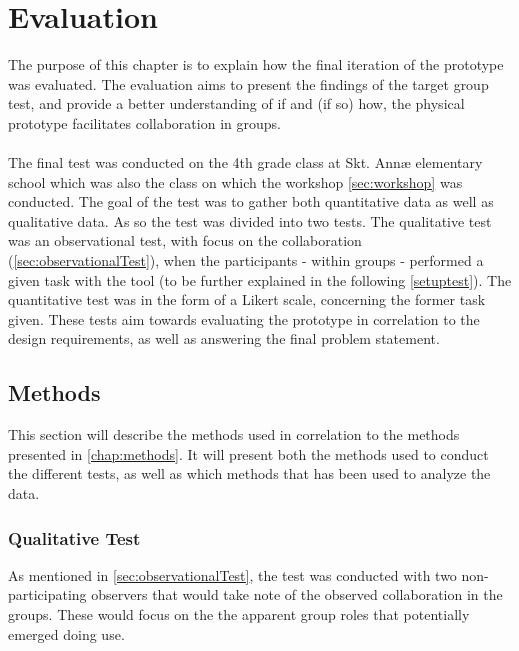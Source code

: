 \chapter{Evaluation}\label{evaluation}

The purpose of this chapter is to explain how the final iteration of the prototype was evaluated. The evaluation aims to present the findings of the target group test, and provide a better understanding of if and (if so) how, the physical prototype facilitates collaboration in groups.\\\\

The final test was conducted on the 4th grade class at Skt. Annæ elementary school which was also the class on which the workshop \autoref{sec:workshop} was conducted. The goal of the test was to gather both quantitative data as well as qualitative data. As so the test was divided into two tests. The qualitative test was an observational test, with focus on the collaboration (\autoref{sec:observationalTest}), when the participants - within groups - performed a given task with the tool (to be further explained in the following \autoref{setuptest}). The quantitative test was in the form of a Likert scale, concerning the former task given. These tests aim towards evaluating the prototype in correlation to the design requirements, as well as answering the final problem statement. 

\section{Methods}
This section will describe the methods used in correlation to the methods presented in \autoref{chap:methods}. It will present both the methods used to conduct the different tests, as well as which methods that has been used to analyze the data.

\subsection{Qualitative Test}
As mentioned in \autoref{sec:observationalTest}, the test was conducted with two non-participating observers that would take note of the observed collaboration in the groups. These would focus on the the apparent group roles that potentially emerged doing use. 


